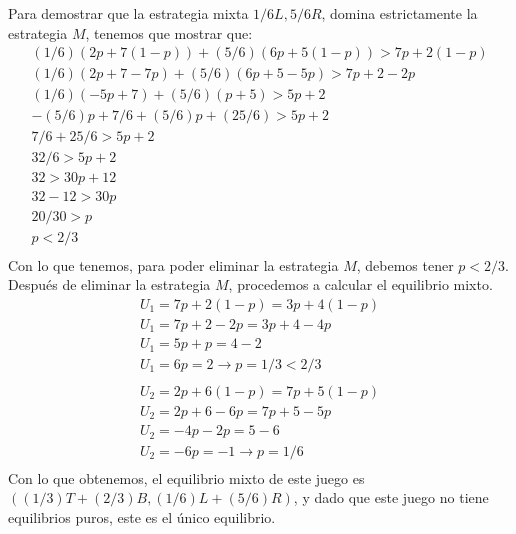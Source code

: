 \documentclass[12pt]{article}
\begin{document}
        \begin{flushleft}
            Para demostrar que la estrategia mixta $1/6L,5/6R$, domina estrictamente la estrategia $M$,
            tenemos que mostrar que:
            \begin{align*}
                (1/6)(2p+7(1-p))+(5/6)(6p+5(1-p))>7p+2(1-p)\\
                (1/6)(2p+7-7p)+(5/6)(6p+5-5p)>7p+2-2p\\
                (1/6)(-5p+7)+(5/6)(p+5)>5p+2\\
                -(5/6)p+7/6+(5/6)p+(25/6)>5p+2\\
                7/6+25/6>5p+2\\
                32/6>5p+2\\
                32>30p+12\\
                32-12>30p\\
                20/30>p\\
                p<2/3\\
            \end{align*}
            Con lo que tenemos, para poder eliminar la estrategia $M$, debemos tener $p<2/3$. Después de eliminar la estrategia $M$, procedemos a calcular el equilibrio mixto.
            \begin{align*}
                U_1 = 7p + 2(1-p) = 3p + 4(1-p)\\
                U_1 = 7p + 2 - 2p = 3p + 4 - 4p\\
                U_1 = 5p + p = 4 - 2\\
                U_1 = 6p = 2 \to p = 1/3<2/3\\
            \end{align*}
            \begin{align*}
                U_2 = 2p + 6(1-p) = 7p + 5(1-p)\\
                U_2 = 2p + 6 - 6p = 7p + 5 - 5p\\
                U_2 = -4p-2p = 5-6\\
                U_2 = -6p = -1 \to p = 1/6\\
            \end{align*}
            Con lo que obtenemos, el equilibrio mixto de este juego es $((1/3)T + (2/3)B, (1/6)L+ (5/6)R)$, y dado que este juego no tiene equilibrios puros, este es el único equilibrio.
        \end{flushleft}
\end{document}

